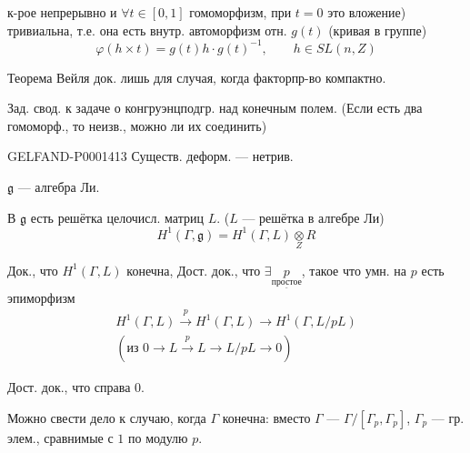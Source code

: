к-рое непрерывно и $\forall t\in[0,1]$ гомоморфизм, при $t=0$ это вложение) тривиальна, т.е. она есть внутр. автоморфизм отн. $g(t)$ (кривая в группе)
\begin{equation*}\varphi(h\times t)=g(t)h\cdot g(t)^{-1},\qquad h\in SL(n,Z)\end{equation*}

Теорема Вейля док. лишь для случая, когда факторпр-во компактно.

Зад. свод. к задаче о конгруэнцподгр. над конечным полем.
(Если есть два гомоморф., то неизв., можно ли их соединить)

\begin{GelfandAdjacentEvidence}{GELFAND-P000141}{3}
Существ. деформ. — нетрив.
\begin{center}
\end{center}
\end{GelfandAdjacentEvidence}

$\mathfrak g$ — алгебра Ли.

В $\mathfrak g$ есть решётка целочисл. матриц $L$. ($L$ — решётка в алгебре Ли)
\begin{equation*}H^1(\Gamma,\mathfrak g)=H^1(\Gamma,L)\underset Z\otimes R\end{equation*}

Док., что $H^1(\Gamma,L)$ конечна,
Дост. док., что $\exists\underset{\underline{\text{простое}}}{p}$, такое что умн. на $p$ есть эпиморфизм
\begin{gather*}
H^1(\Gamma,L)\overset p\longrightarrow H^1(\Gamma,L)\longrightarrow H^1(\Gamma,L/pL)\\
(\text{из }0\longrightarrow L\overset p\longrightarrow L\longrightarrow L/pL\longrightarrow0)
\end{gather*}

Дост. док., что справа $0$.

Можно свести дело к случаю, когда $\Gamma$ конечна: вместо $\Gamma$ — $\Gamma/[\Gamma_p,\Gamma_p]$, $\Gamma_p$ — гр. элем., сравнимые с $1$ по модулю $p$.



